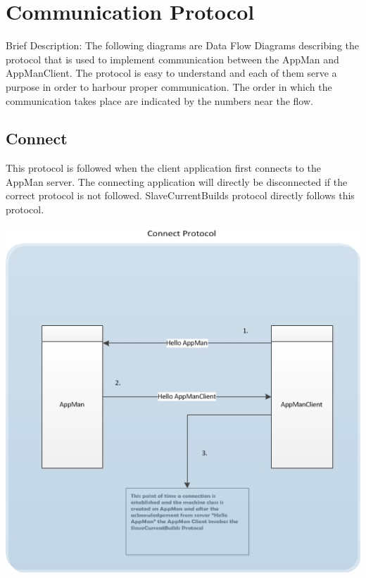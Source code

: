 \documentclass[a4paper,12pt,final]{article}
\begin{document}
\section{Communication Protocol}
Brief Description: The following diagrams are Data Flow Diagrams describing the protocol that is used to implement communication between the AppMan and AppManClient. The protocol is easy to understand and each of them serve a purpose in order to harbour proper communication. The order in which the communication takes place are indicated by the numbers near the flow.
\vspace{12pt}\newline

\subsection{Connect}
This protocol is followed when the client application first connects to the AppMan server. The connecting application will directly be disconnected if the correct protocol is not followed. SlaveCurrentBuilds protocol directly follows this protocol.
\begin{center}
\includegraphics[scale=1.0]{CommunicationProtocol/ConnectProtocol.jpg} 
\end{center}
\end{document}
